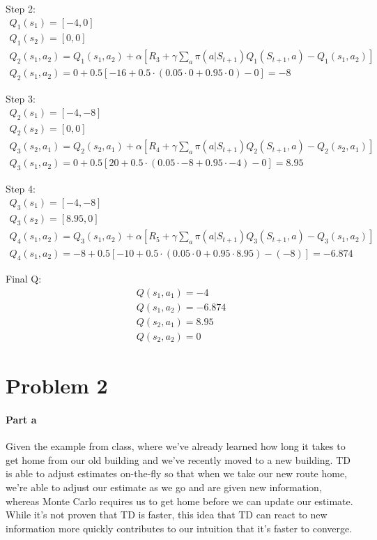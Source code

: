 \documentclass[12pt]{article}
\begin{document}
Step 2:
\begin{gather*}
  Q_1(s_1) = [-4, 0] \\
  Q_1(s_2) = [0, 0] \\
  Q_2(s_1, a_2) = Q_1(s_1, a_2) + \alpha [R_3 + \gamma \sum_{a} \pi(a|S_{t+1}) Q_1(S_{t+1}, a) - Q_1(s_1, a_2)] \\
  Q_2(s_1, a_2) = 0 + 0.5 [-16 + 0.5 \cdot (0.05 \cdot 0 + 0.95 \cdot 0) - 0] = -8
\end{gather*}

Step 3:
\begin{gather*}
  Q_2(s_1) = [-4, -8] \\
  Q_2(s_2) = [0, 0] \\
  Q_3(s_2, a_1) = Q_2(s_2, a_1) + \alpha [R_4 + \gamma \sum_{a} \pi(a|S_{t+1}) Q_2(S_{t+1}, a) - Q_2(s_2, a_1)] \\
  Q_3(s_1, a_2) = 0 + 0.5 [20 + 0.5 \cdot (0.05 \cdot -8 + 0.95 \cdot -4) - 0] = 8.95
\end{gather*}

Step 4:
\begin{gather*}
  Q_3(s_1) = [-4, -8] \\
  Q_3(s_2) = [8.95, 0] \\
  Q_4(s_1, a_2) = Q_3(s_1, a_2) + \alpha [R_5 + \gamma \sum_{a} \pi(a|S_{t+1}) Q_3(S_{t+1}, a) - Q_3(s_1, a_2)] \\
  Q_4(s_1, a_2) = -8 + 0.5 [-10 + 0.5 \cdot (0.05 \cdot 0 + 0.95 \cdot 8.95) - (-8)] = -6.874
\end{gather*}

Final Q:
\begin{gather*}
  Q(s_1, a_1) = -4 \\
  Q(s_1, a_2) = -6.874 \\
  Q(s_2, a_1) = 8.95 \\
  Q(s_2, a_2) = 0
\end{gather*}

\section{Problem 2}

\paragraph{Part a}

Given the example from class, where we've already learned how long it takes to get home from our old building and we've recently moved to a new building. TD is able to adjust estimates on-the-fly so that when we take our new route home, we're able to adjust our estimate as we go and are given new information, whereas Monte Carlo requires us to get home before we can update our estimate. While it's not proven that TD is faster, this idea that TD can react to new information more quickly contributes to our intuition that it's faster to converge.
\end{document}
